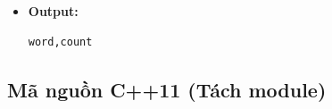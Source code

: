 \begin{itemize}
\begin{itemize}
        \item \textbf{Module 7 (Ghi output):}

        \begin{itemize}
            \item Ghi file \texttt{freq.csv}
            \item Format:
\begin{lstlisting}
word,count
\end{lstlisting}
        \end{itemize}

    \end{itemize}

    \item \textbf{Output:}

\begin{lstlisting}
word,count
\end{lstlisting}

\end{itemize}

\subsection{Mã nguồn C++11 (Tách module)}

